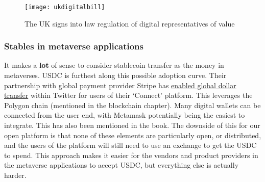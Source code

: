 \begin{figure}
  \centering
    \texttt{[image: ukdigitalbill]}
  \caption{The UK signs into law regulation of digital representatives of value}
  \label{fig:ukdigitalbill}
\end{figure}

\subsubsection{Stables in metaverse applications}
It makes a \textbf{lot} of sense to consider stablecoin transfer as the money in metaverses. USDC is furthest along this possible adoption curve. Their partnership with global payment provider Stripe has \href{https://stripe.com/blog/expanding-global-payouts-with-crypto}{enabled global dollar transfer} within Twitter for users of their `Connect' platform. This leverages the Polygon chain (mentioned in the blockchain chapter). Many digital wallets can be connected from the user end, with Metamask potentially being the easiest to integrate. This has also been mentioned in the book. The downside of this for our open platform is that none of these elements are particularly open, or distributed, and the users of the platform will still need to use an exchange to get the USDC to spend. This approach makes it easier for the vendors and product providers in the metaverse applications to accept USDC, but everything else is actually harder.

